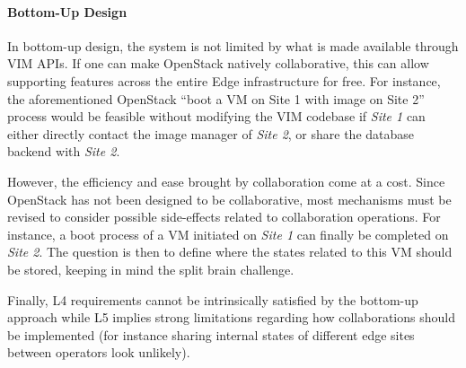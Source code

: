 

\paragraph{Bottom-Up Design}
In bottom-up design, the system is not limited by what is made
available through VIM APIs. If one can make OpenStack natively
collaborative, this can allow supporting features across the entire
Edge infrastructure for free. For instance, the aforementioned
OpenStack ``boot a VM on Site 1 with image on Site 2'' process would
be feasible without modifying the VIM codebase if \emph{Site 1} can
either directly contact the image manager of \emph{Site 2}, or share
the database backend with \emph{Site 2}.

However, the efficiency and ease brought by collaboration come at a
cost. Since OpenStack has not been designed to be collaborative, most
mechanisms must be revised to consider possible side-effects related to
collaboration operations.
%
For instance, a boot process of a VM initiated on \emph{Site 1} can finally be
completed on \emph{Site 2}. The question is then to define where the states
related to this VM should be stored, keeping in mind the split brain
challenge.

Finally, L4 requirements cannot be intrinsically satisfied by the
bottom-up approach while L5 implies strong limitations regarding how
collaborations should be implemented (for instance sharing internal
states of different edge sites between operators look unlikely).

%



